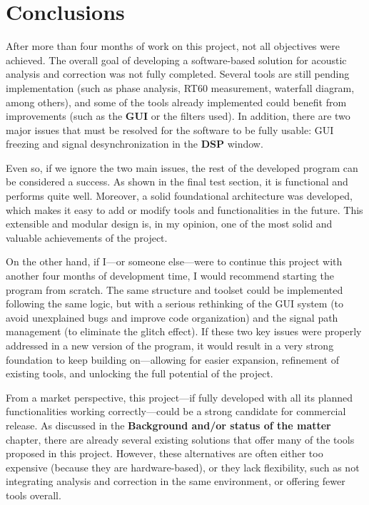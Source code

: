 \chapter{Conclusions}

After more than four months of work on this project, not all objectives were achieved. The overall goal of developing a software-based solution for acoustic analysis and correction was not fully completed. Several tools are still pending implementation (such as phase analysis, RT60 measurement, waterfall diagram, among others), and some of the tools already implemented could benefit from improvements (such as the \textbf{GUI} or the filters used). In addition, there are two major issues that must be resolved for the software to be fully usable: GUI freezing and signal desynchronization in the \textbf{DSP} window.

Even so, if we ignore the two main issues, the rest of the developed program can be considered a success. As shown in the final test section, it is functional and performs quite well. Moreover, a solid foundational architecture was developed, which makes it easy to add or modify tools and functionalities in the future. This extensible and modular design is, in my opinion, one of the most solid and valuable achievements of the project.

On the other hand, if I—or someone else—were to continue this project with another four months of development time, I would recommend starting the program from scratch. The same structure and toolset could be implemented following the same logic, but with a serious rethinking of the GUI system (to avoid unexplained bugs and improve code organization) and the signal path management (to eliminate the glitch effect). If these two key issues were properly addressed in a new version of the program, it would result in a very strong foundation to keep building on—allowing for easier expansion, refinement of existing tools, and unlocking the full potential of the project.

From a market perspective, this project—if fully developed with all its planned functionalities working correctly—could be a strong candidate for commercial release. As discussed in the \textbf{Background and/or status of the matter} chapter, there are already several existing solutions that offer many of the tools proposed in this project. However, these alternatives are often either too expensive (because they are hardware-based), or they lack flexibility, such as not integrating analysis and correction in the same environment, or offering fewer tools overall.

